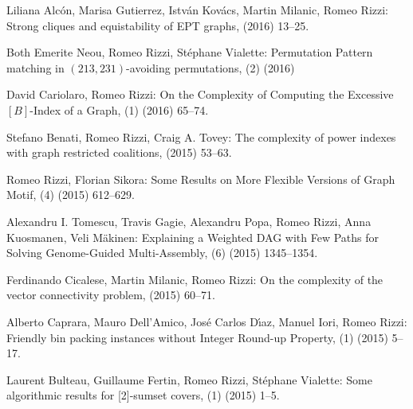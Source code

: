 \begin{etaremune}
  \item {\sc Liliana Alcón, Marisa Gutierrez, István Kovács, Martin Milanic, Romeo Rizzi:}
   \newblock Strong cliques and equistability of EPT graphs,
    (2016) 13--25.

  \item {\sc Both Emerite Neou, Romeo Rizzi, Stéphane Vialette:}
   \newblock Permutation Pattern matching in $(213, 231)$-avoiding permutations,
   (2) (2016)
   
  \item {\sc David Cariolaro, Romeo Rizzi:}
   \newblock On the Complexity of Computing the Excessive $[B]$-Index of a Graph,
   (1) (2016) 65--74.

  \item {\sc Stefano Benati, Romeo Rizzi, Craig A. Tovey:}
   \newblock The complexity of power indexes with graph restricted coalitions,
    (2015) 53--63.

  \item {\sc Romeo Rizzi, Florian Sikora:}
   \newblock Some Results on More Flexible Versions of Graph Motif,
   (4) (2015) 612--629.

  \item {\sc Alexandru I. Tomescu, Travis Gagie, Alexandru Popa, Romeo Rizzi, Anna Kuosmanen, Veli Mäkinen:}
   \newblock Explaining a Weighted DAG with Few Paths for Solving Genome-Guided Multi-Assembly,
   (6) (2015) 1345--1354.

  \item {\sc Ferdinando Cicalese, Martin Milanic, Romeo Rizzi:}
   \newblock On the complexity of the vector connectivity problem,
    (2015) 60--71.        

  \item {\sc Alberto Caprara, Mauro Dell'Amico, Jos\'e Carlos D\'\i{}az, Manuel Iori, Romeo Rizzi:}
   \newblock Friendly bin packing instances without Integer Round-up Property,
   (1) (2015) 5--17.

  \item {\sc Laurent Bulteau, Guillaume Fertin, Romeo Rizzi, St\'ephane Vialette:}
   \newblock  Some algorithmic results for [2]-sumset covers,
   (1) (2015) 1--5.


\end{etaremune}
